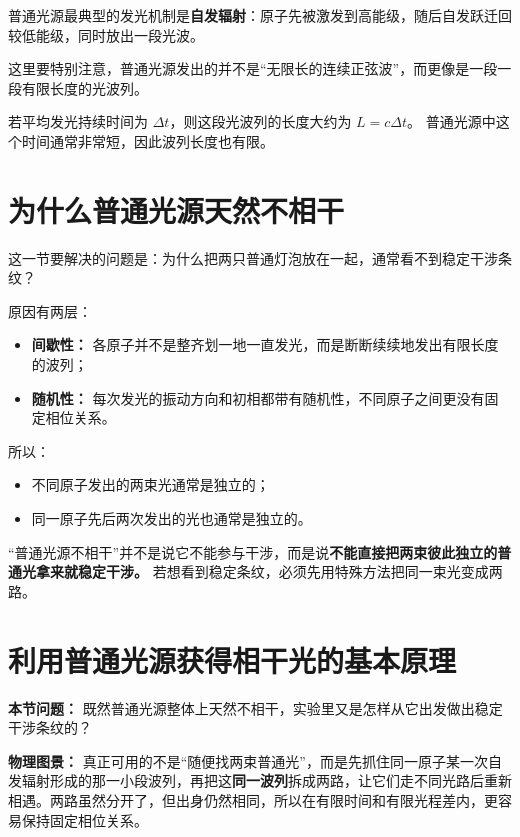 \documentclass[lang=cn,11pt]{elegantbook}
\begin{document}
普通光源最典型的发光机制是\textbf{自发辐射}：原子先被激发到高能级，随后自发跃迁回较低能级，同时放出一段光波。

\begin{note}
这里要特别注意，普通光源发出的并不是“无限长的连续正弦波”，而更像是一段一段有限长度的光波列。
\end{note}

若平均发光持续时间为 \(\Delta t\)，则这段光波列的长度大约为 \(L=c\Delta t\)。
普通光源中这个时间通常非常短，因此波列长度也有限。

\section{为什么普通光源天然不相干}

这一节要解决的问题是：为什么把两只普通灯泡放在一起，通常看不到稳定干涉条纹？

原因有两层：
\begin{itemize}
  \item \textbf{间歇性：} 各原子并不是整齐划一地一直发光，而是断断续续地发出有限长度的波列；
  \item \textbf{随机性：} 每次发光的振动方向和初相都带有随机性，不同原子之间更没有固定相位关系。
\end{itemize}

所以：
\begin{itemize}
  \item 不同原子发出的两束光通常是独立的；
  \item 同一原子先后两次发出的光也通常是独立的。
\end{itemize}

\begin{note}
“普通光源不相干”并不是说它不能参与干涉，而是说\textbf{不能直接把两束彼此独立的普通光拿来就稳定干涉。} 若想看到稳定条纹，必须先用特殊方法把同一束光变成两路。
\end{note}

\section{利用普通光源获得相干光的基本原理}

\textbf{本节问题：} 既然普通光源整体上天然不相干，实验里又是怎样从它出发做出稳定干涉条纹的？

\textbf{物理图景：} 真正可用的不是“随便找两束普通光”，而是先抓住同一原子某一次自发辐射形成的那一小段波列，再把这\textbf{同一波列}拆成两路，让它们走不同光路后重新相遇。两路虽然分开了，但出身仍然相同，所以在有限时间和有限光程差内，更容易保持固定相位关系。
\end{document}
